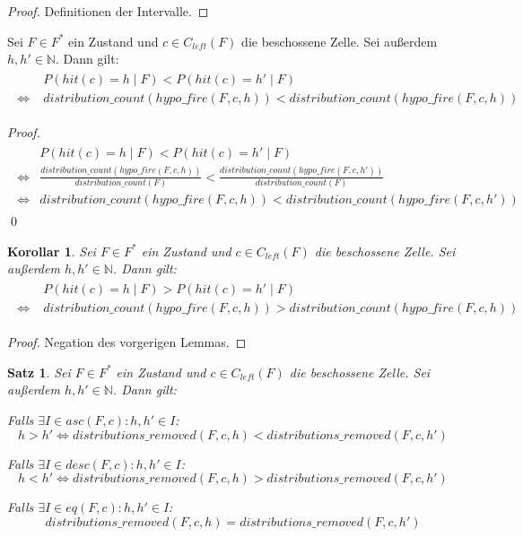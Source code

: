 \documentclass[a4paper,12pt]{llncs}
\newcommand{\N}{{\mathbb{N}}}
\numberwithin{equation}{section}
\newtheorem{satz}{Satz}
\newtheorem{korollar}{Korollar}
\begin{document}
\begin{proof}
Definitionen der Intervalle.
\end{proof}

\begin{lemma}
Sei $F\in F^*$ ein Zustand und $c \in C_{left}(F)$ die beschossene Zelle.
Sei außerdem $h,h' \in \N$.
Dann gilt:
\begin{align}
\begin{split}
&P(hit(c)=h \mid F) < P(hit(c)=h' \mid F) \\
\Leftrightarrow \; &distribution\_count(hypo\_fire(F, c, h)) < distribution\_count(hypo\_fire(F, c, h))
\nonumber
\end{split}
\end{align}
\end{lemma}

\begin{proof}
\begin{align}
\begin{split}
&P(hit(c)=h \mid F) < P(hit(c)=h' \mid F) \\
\Leftrightarrow
&\frac{distribution\_count(hypo\_fire(F,c, h))}{distribution\_count(F)} < \frac{distribution\_count(hypo\_fire(F,c, h'))}{distribution\_count(F)} \\
\Leftrightarrow
&distribution\_count(hypo\_fire(F,c, h)) < distribution\_count(hypo\_fire(F,c, h'))
\nonumber
\end{split}
\end{align}
\qed
\end{proof}

\begin{korollar}
Sei $F\in F^*$ ein Zustand und $c \in C_{left}(F)$ die beschossene Zelle.
Sei außerdem $h,h' \in \N$.
Dann gilt:
\begin{align}
\begin{split}
&P(hit(c)=h \mid F) > P(hit(c)=h' \mid F) \\
\Leftrightarrow \; &distribution\_count(hypo\_fire(F, c, h)) > distribution\_count(hypo\_fire(F, c, h))
\nonumber
\end{split}
\end{align}
\end{korollar}

\begin{proof}
Negation des vorgerigen Lemmas.
\end{proof}

\begin{satz}
Sei $F\in F^*$ ein Zustand und $c \in C_{left}(F)$ die beschossene Zelle.
Sei außerdem $h,h' \in \N$.
Dann gilt:

Falls $\exists I \in asc(F, c) \colon h,h' \in I$:
\[
h > h' \Leftrightarrow distributions\_removed(F,c, h) < distributions\_removed(F,c, h')
\]

Falls $\exists I \in desc(F, c) \colon h,h' \in I$:
\[
h < h' \Leftrightarrow distributions\_removed(F,c, h) > distributions\_removed(F,c, h')
\]

Falls $\exists I \in eq(F, c) \colon h,h' \in I$:
\[
distributions\_removed(F,c, h) = distributions\_removed(F,c, h')
\]
\end{satz}
\end{document}
